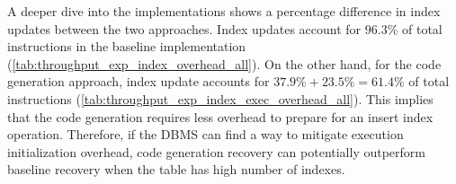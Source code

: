 \documentclass[12pt]{cmuthesis}
\begin{document}
\begin{table}[H]
\begin{center}
\caption{\textbf{Callgrind breakdown on a Query Execution step of Code Generation Index Recovery}. Number of indexes is 10. The query execution step accounts for 96\% IR for a single replay step.}
\label{tab:throughput_exp_index_exec_overhead_all}
\end{center}
\end{table}

A deeper dive into the implementations shows a percentage difference in index updates between the two approaches. Index updates account for $96.3\%$ of total instructions in the baseline implementation (\cref{tab:throughput_exp_index_overhead_all}). On the other hand, for the code generation approach, index update accounts for $37.9\% + 23.5\% = 61.4\%$ of total instructions (\cref{tab:throughput_exp_index_exec_overhead_all}). This implies that the code generation requires less overhead to prepare for an insert index operation. Therefore, if the DBMS can find a way to mitigate execution initialization overhead, code generation recovery can potentially outperform baseline recovery when the table has high number of indexes.
\end{document}
